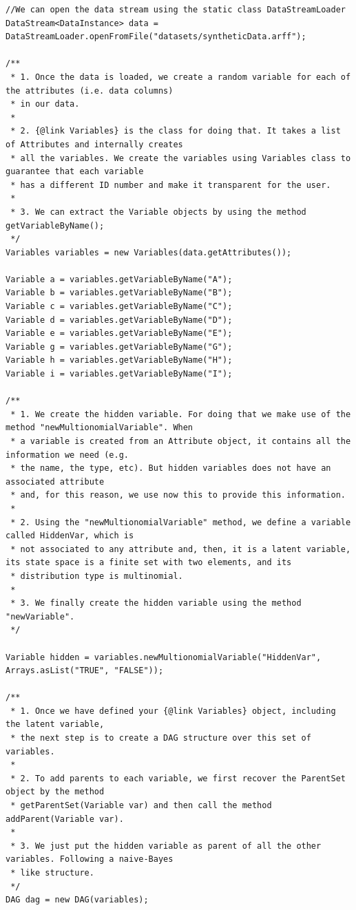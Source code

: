 \begin{lstlisting}
//We can open the data stream using the static class DataStreamLoader
DataStream<DataInstance> data = DataStreamLoader.openFromFile("datasets/syntheticData.arff");

/**
 * 1. Once the data is loaded, we create a random variable for each of the attributes (i.e. data columns)
 * in our data.
 *
 * 2. {@link Variables} is the class for doing that. It takes a list of Attributes and internally creates
 * all the variables. We create the variables using Variables class to guarantee that each variable
 * has a different ID number and make it transparent for the user.
 *
 * 3. We can extract the Variable objects by using the method getVariableByName();
 */
Variables variables = new Variables(data.getAttributes());

Variable a = variables.getVariableByName("A");
Variable b = variables.getVariableByName("B");
Variable c = variables.getVariableByName("C");
Variable d = variables.getVariableByName("D");
Variable e = variables.getVariableByName("E");
Variable g = variables.getVariableByName("G");
Variable h = variables.getVariableByName("H");
Variable i = variables.getVariableByName("I");

/**
 * 1. We create the hidden variable. For doing that we make use of the method "newMultionomialVariable". When
 * a variable is created from an Attribute object, it contains all the information we need (e.g.
 * the name, the type, etc). But hidden variables does not have an associated attribute
 * and, for this reason, we use now this to provide this information.
 *
 * 2. Using the "newMultionomialVariable" method, we define a variable called HiddenVar, which is
 * not associated to any attribute and, then, it is a latent variable, its state space is a finite set with two elements, and its
 * distribution type is multinomial.
 *
 * 3. We finally create the hidden variable using the method "newVariable".
 */

Variable hidden = variables.newMultionomialVariable("HiddenVar", Arrays.asList("TRUE", "FALSE"));

/**
 * 1. Once we have defined your {@link Variables} object, including the latent variable,
 * the next step is to create a DAG structure over this set of variables.
 *
 * 2. To add parents to each variable, we first recover the ParentSet object by the method
 * getParentSet(Variable var) and then call the method addParent(Variable var).
 *
 * 3. We just put the hidden variable as parent of all the other variables. Following a naive-Bayes
 * like structure.
 */
DAG dag = new DAG(variables);


\end{lstlisting}
